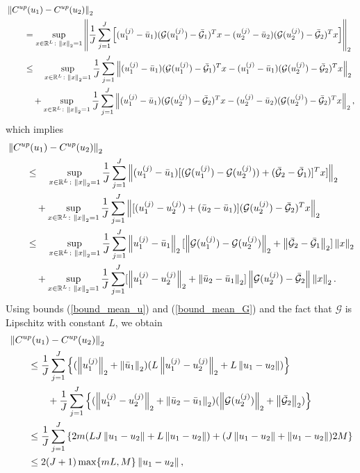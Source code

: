 \begin{align*}
& \left\|C^{up}(u_1) - C^{up}(u_2)\right\|_2 \\
& \qquad = \sup_{x \in \mathbb{R}^L \colon \left\|x\right\|_2 = 1} \left \lVert \frac{1}{J} \sum_{j=1}^J \left [ (u_1^{(j)} - \bar{u}_1) (\mathcal{G}(u_1^{(j)}) - \bar{\mathcal{G}}_1)^T x - (u_2^{(j)} - \bar{u}_2) (\mathcal{G}(u_2^{(j)}) - \bar{\mathcal{G}}_2)^T x \right ] \right \rVert_2 \\
& \qquad \le \quad \sup_{x \in \mathbb{R}^L \colon \left\|x\right\|_2 = 1} \frac{1}{J} \sum_{j=1}^J \left \lVert (u_1^{(j)} - \bar{u}_1) (\mathcal{G}(u_1^{(j)}) - \bar{\mathcal{G}}_1)^T x - (u_1^{(j)} - \bar{u}_1) (\mathcal{G}(u_2^{(j)}) - \bar{\mathcal{G}}_2)^T x \right \rVert_2 \\
& \qquad \quad + \sup_{x \in \mathbb{R}^L \colon \left\|x\right\|_2 = 1} \frac{1}{J} \sum_{j=1}^J \left \lVert (u_1^{(j)} - \bar{u}_1) (\mathcal{G}(u_2^{(j)}) - \bar{\mathcal{G}}_2)^T x - (u_2^{(j)} - \bar{u}_2) (\mathcal{G}(u_2^{(j)}) - \bar{\mathcal{G}}_2)^T x \right \rVert_2,
\end{align*}
which implies
\begin{align*}
& \left\|C^{up}(u_1) - C^{up}(u_2)\right\|_2 \\
& \qquad \le \quad \sup_{x \in \mathbb{R}^L \colon \left\|x\right\|_2 = 1} \frac{1}{J} \sum_{j=1}^J \left \lVert (u_1^{(j)} - \bar{u}_1) [ (\mathcal{G}(u_1^{(j)}) - \mathcal{G}(u_2^{(j)})) + (\bar{\mathcal{G}}_2 - \bar{\mathcal{G}}_1)]^T x ] \right \rVert_2 \\
& \qquad \quad + \sup_{x \in \mathbb{R}^L \colon \left\|x\right\|_2 = 1} \frac{1}{J} \sum_{j=1}^J \left \lVert [ (u_1^{(j)} - u_2^{(j)}) + (\bar{u}_2 - \bar{u}_1) ] (\mathcal{G}(u_2^{(j)}) - \bar{\mathcal{G}}_2)^T x \right \rVert_2 \\ 
& \qquad \le \quad \sup_{x \in \mathbb{R}^L \colon \left\|x\right\|_2 = 1} \frac{1}{J} \sum_{j=1}^J \left\|u_1^{(j)} - \bar{u}_1\right\|_2 [ \left\|\mathcal{G}(u_1^{(j)}) - \mathcal{G}(u_2^{(j)})\right\|_2 + \left\|\bar{\mathcal{G}}_2 - \bar{\mathcal{G}}_1\right\|_2 ] \left\|x\right\|_2 \\
& \qquad \quad + \sup_{x \in \mathbb{R}^L \colon \left\|x\right\|_2 = 1} \frac{1}{J} \sum_{j=1}^J [ \left\|u_1^{(j)} - u_2^{(j)}\right\|_2 + \left\|\bar{u}_2 - \bar{u}_1\right\|_2 ] \left\|\mathcal{G}(u_2^{(j)}) - \bar{\mathcal{G}}_2\right\| \left\|x\right\|_2.
\end{align*}
Using bounds (\ref{bound_mean_u}) and (\ref{bound_mean_G}) and the fact that $\mathcal{G}$ is Lipschitz with constant $L$, we obtain
\begin{align*}
& \left\|C^{up}(u_1) - C^{up}(u_2)\right\|_2 \\
& \qquad \le \frac{1}{J} \sum_{j=1}^J \left \{ (\left\|u_1^{(j)}\right\|_2 + \left\|\bar{u}_1\right\|_2) (L \left\|u_1^{(j)} - u_2^{(j)}\right\|_2 + L \left\|u_1 - u_2\right\|) \right \} \\
& \qquad \qquad + \frac{1}{J} \sum_{j=1}^J \left \{ (\left\|u_1^{(j)} - u_2^{(j)}\right\|_2 + \left\|\bar{u}_2 - \bar{u}_1\right\|_2) (\left\|\mathcal{G}(u_2^{(j)})\right\|_2 + \left\|\bar{\mathcal{G}}_2\right\|_2) \right \} \\
& \qquad \le \frac{1}{J} \sum_{j=1}^J \left \{ 2m ( LJ \left\|u_1 - u_2\right\| + L \left\|u_1 - u_2\right\| ) + ( J \left\|u_1 - u_2\right\| + \left\|u_1 - u_2\right\| ) 2M \right \} \\
& \qquad \le 2 (J+1) \max \{ mL, M \} \left\|u_1 - u_2\right\|,
\end{align*}
